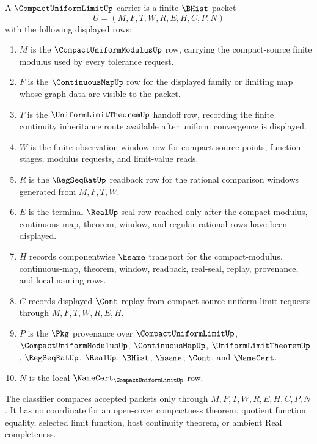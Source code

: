 \begin{definition}
\label{def:compact-uniform-limit-carrier}
A $\CompactUniformLimitUp$ carrier is a finite $\BHist$ packet
$$
U=(M,F,T,W,R,E,H,C,P,N)
$$
with the following displayed rows:
\begin{enumerate}
\item $M$ is the $\CompactUniformModulusUp$ row, carrying the compact-source finite modulus used by every tolerance request.
\item $F$ is the $\ContinuousMapUp$ row for the displayed family or limiting map whose graph data are visible to the packet.
\item $T$ is the $\UniformLimitTheoremUp$ handoff row, recording the finite continuity inheritance route available after uniform convergence is displayed.
\item $W$ is the finite observation-window row for compact-source points, function stages, modulus requests, and limit-value reads.
\item $R$ is the $\RegSeqRatUp$ readback row for the rational comparison windows generated from $M,F,T,W$.
\item $E$ is the terminal $\RealUp$ seal row reached only after the compact modulus, continuous-map, theorem, window, and regular-rational rows have been displayed.
\item $H$ records componentwise $\hsame$ transport for the compact-modulus, continuous-map, theorem, window, readback, real-seal, replay, provenance, and local naming rows.
\item $C$ records displayed $\Cont$ replay from compact-source uniform-limit requests through $M,F,T,W,R,E,H$.
\item $P$ is the $\Pkg$ provenance over $\CompactUniformLimitUp$, $\CompactUniformModulusUp$, $\ContinuousMapUp$, $\UniformLimitTheoremUp$, $\RegSeqRatUp$, $\RealUp$, $\BHist$, $\hsame$, $\Cont$, and $\NameCert$.
\item $N$ is the local $\NameCert_{\CompactUniformLimitUp}$ row.
\end{enumerate}
The classifier compares accepted packets only through $M,F,T,W,R,E,H,C,P,N$. It has no coordinate for an open-cover compactness theorem, quotient function equality, selected limit function, host continuity theorem, or ambient Real completeness.
\end{definition}


